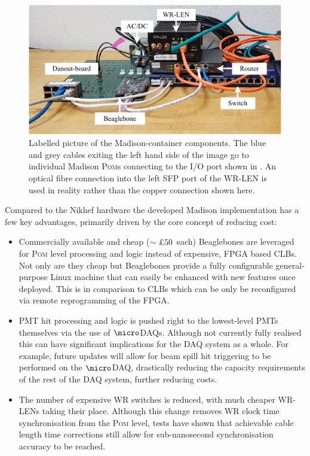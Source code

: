 \begin{figure} %
    \includegraphics[width=\textwidth]{diagrams/5-daq/madison_box.pdf}
    \caption[Labelled picture of the Madison-container components]
    {Labelled picture of the Madison-container components. The blue and grey cables exiting the
        left hand side of the image go to individual Madison \textsc{Pom}s connecting to the I/O
        port shown in . An optical fibre connection into the left SFP
        port of the WR-LEN is used in reality rather than the copper connection shown here.}
    \label{fig:madison_box}
\end{figure}

Compared to the Nikhef hardware the \chips developed Madison implementation has a few key
advantages, primarily driven by the core \chips concept of reducing cost:
\begin{itemize}
    \item Commercially available and cheap ($\sim\text{\textsterling}50$ each) Beaglebones are
    leveraged for \textsc{Pom} level processing and logic instead of expensive, FPGA based CLBs.
    Not only are they cheap but Beaglebones provide a fully configurable general-purpose Linux
    machine that can easily be enhanced with new features once deployed. This is in comparison to
    CLBs which can be only be reconfigured via remote reprogramming of the FPGA.

    \item PMT hit processing and logic is pushed right to the lowest-level PMTs themselves via the
    use of $\micro$DAQs. Although not currently fully realised this can have significant
    implications for the DAQ system as a whole. For example, future updates will allow for beam
    spill hit triggering to be performed on the $\micro$DAQ, drastically reducing the capacity
    requirements of the rest of the DAQ system, further reducing costs.

    \item The number of expensive WR switches is reduced, with much cheaper WR-LENs taking their
    place. Although this change removes WR clock time synchronisation from the \textsc{Pom} level,
    tests have shown that achievable cable length time corrections still allow for sub-nanosecond
    synchronisation accuracy to be reached.
\end{itemize}

